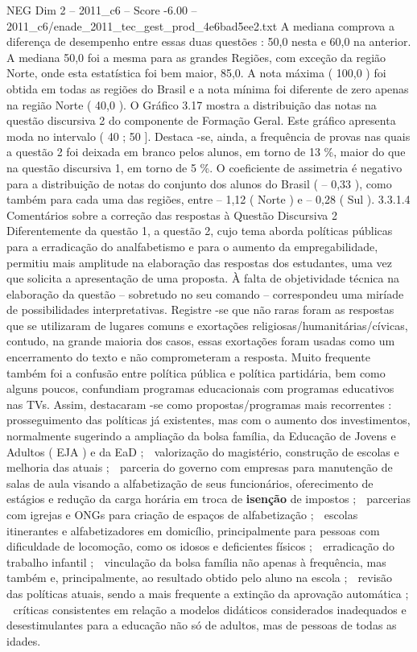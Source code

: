 \begin{textsample}{NEG Dim 2 – 2011\_c6 – Score -6.00 – 2011\_c6/enade\_2011\_tec\_gest\_prod\_4e6bad5ee2.txt}
A mediana comprova a diferença de desempenho entre essas duas questões : 50,0 nesta e 60,0 na anterior.
A mediana 50,0 foi a mesma para as grandes Regiões, com exceção da região Norte, onde esta estatística foi bem maior, 85,0.
A nota máxima ( 100,0 ) foi obtida em todas as regiões do Brasil e a nota mínima foi diferente de zero apenas na região Norte ( 40,0 ).
O Gráfico 3.17 mostra a distribuição das notas na questão discursiva 2 do componente de Formação Geral.
Este gráfico apresenta moda no intervalo ( 40 ; 50 ].
Destaca -se, ainda, a frequência de provas nas quais a questão 2 foi deixada em branco pelos alunos, em torno de 13 \%, maior do que na questão discursiva 1, em torno de 5 \%.
O coeficiente de assimetria é negativo para a distribuição de notas do conjunto dos alunos do Brasil ( – 0,33 ), como também para cada uma das regiões, entre – 1,12 ( Norte ) e – 0,28 ( Sul ). 3.3.1.4 Comentários sobre a correção das respostas à Questão Discursiva 2 Diferentemente da questão 1, a questão 2, cujo tema aborda políticas públicas para a erradicação do analfabetismo e para o aumento da empregabilidade, permitiu mais amplitude na elaboração das respostas dos estudantes, uma vez que solicita a apresentação de uma proposta.
À falta de objetividade técnica na elaboração da questão – sobretudo no seu comando – correspondeu uma miríade de possibilidades interpretativas.
Registre -se que não raras foram as respostas que se utilizaram de lugares comuns e exortações religiosas/humanitárias/cívicas, contudo, na grande maioria dos casos, essas exortações foram usadas como um encerramento do texto e não comprometeram a resposta.
Muito frequente também foi a confusão entre política pública e política partidária, bem como alguns poucos, confundiam programas educacionais com programas educativos nas TVs.
Assim, destacaram -se como propostas/programas mais recorrentes :  prosseguimento das políticas já existentes, mas com o aumento dos investimentos, normalmente sugerindo a ampliação da bolsa família, da Educação de Jovens e Adultos ( EJA ) e da EaD ;  valorização do magistério, construção de escolas e melhoria das atuais ;  parceria do governo com empresas para manutenção de salas de aula visando a alfabetização de seus funcionários, oferecimento de estágios e redução da carga horária em troca de \textbf{isenção} de impostos ;  parcerias com igrejas e ONGs para criação de espaços de alfabetização ;  escolas itinerantes e alfabetizadores em domicílio, principalmente para pessoas com dificuldade de locomoção, como os idosos e deficientes físicos ;  erradicação do trabalho infantil ;  vinculação da bolsa família não apenas à frequência, mas também e, principalmente, ao resultado obtido pelo aluno na escola ;  revisão das políticas atuais, sendo a mais frequente a extinção da aprovação automática ;  críticas consistentes em relação a modelos didáticos considerados inadequados e desestimulantes para a educação não só de adultos, mas de pessoas de todas as idades.

\end{textsample}
